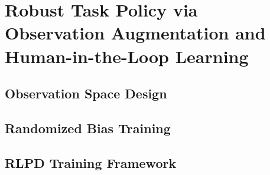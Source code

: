 
\chapter{Robust Task Policy via Observation Augmentation and Human-in-the-Loop Learning}\label{ch:task_policy}

\section{Observation Space Design}\label{sec:obs_design}

%
%

\section{Randomized Bias Training}\label{sec:random_bias}

%
%

\section{RLPD Training Framework}\label{sec:rlpd}

%
%
%

